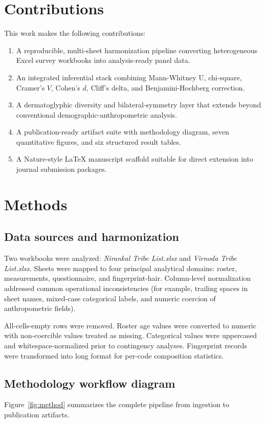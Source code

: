 \documentclass[pdflatex,sn-mathphys-num]{sn-jnl}
\begin{document}
\section{Contributions}
This work makes the following contributions:
\begin{enumerate}
\item A reproducible, multi-sheet harmonization pipeline converting heterogeneous Excel survey workbooks into analysis-ready panel data.
\item An integrated inferential stack combining Mann-Whitney U, chi-square, Cramer's \(V\), Cohen's \(d\), Cliff's delta, and Benjamini-Hochberg correction.
\item A dermatoglyphic diversity and bilateral-symmetry layer that extends beyond conventional demographic-anthropometric analysis.
\item A publication-ready artifact suite with methodology diagram, seven quantitative figures, and six structured result tables.
\item A Nature-style LaTeX manuscript scaffold suitable for direct extension into journal submission packages.
\end{enumerate}

\section{Methods}
\subsection{Data sources and harmonization}
Two workbooks were analyzed: \textit{Nirankal Tribe List.xlsx} and \textit{Virnoda Tribe List.xlsx}. Sheets were mapped to four principal analytical domains: roster, measurements, questionnaire, and fingerprint-hair. Column-level normalization addressed common operational inconsistencies (for example, trailing spaces in sheet names, mixed-case categorical labels, and numeric coercion of anthropometric fields).

All-cells-empty rows were removed. Roster age values were converted to numeric with non-coercible values treated as missing. Categorical values were uppercased and whitespace-normalized prior to contingency analyses. Fingerprint records were transformed into long format for per-code composition statistics.

\subsection{Methodology workflow diagram}
Figure~\ref{fig:method} summarizes the complete pipeline from ingestion to publication artifacts.
\end{document}

